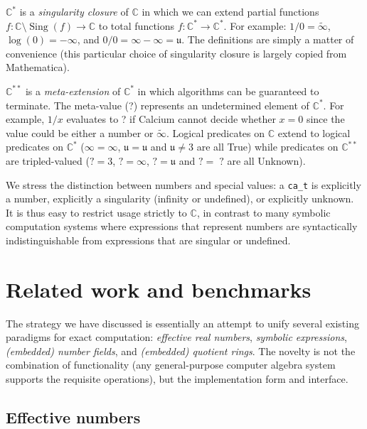 \documentclass[sigconf,screen,urlbreakonhyphens]{acmart}
\begin{document}
$\mathbb{C}^{*}$ is a \emph{singularity closure} of $\mathbb{C}$ in which
we can extend partial functions $f : \mathbb{C} \setminus \operatorname{Sing}(f) \rightarrow \mathbb{C}$ to
total functions $f : \mathbb{C}^{*} \rightarrow \mathbb{C}^{*}$.
For example: $1 / 0 = \tilde \infty$, $\log(0) = -\infty$, and $0 / 0 = \infty - \infty = \mathfrak{u}$.
The definitions are simply a matter of convenience
(this particular choice of singularity closure is largely copied from Mathematica).

$\mathbb{C}^{**}$ is a \emph{meta-extension} of $\mathbb{C}^{*}$
in which algorithms can be guaranteed to terminate.
The meta-value (?) represents an undetermined element of $\mathbb{C}^{*}$.
For example, $1 / x$ evaluates to ? if Calcium cannot decide whether $x = 0$
since the value could be either a number or $\tilde \infty$.
Logical predicates on $\mathbb{C}$ extend to logical predicates on $\mathbb{C}^{*}$
($\infty = \infty$, $\mathfrak{u} = \mathfrak{u}$ and $\mathfrak{u} \ne 3$ are all True)
while predicates on $\mathbb{C}^{**}$ are tripled-valued
($? = 3$, $? = \infty$, $? = \mathfrak{u}$ and $? =\;?$ are all Unknown).

We stress the distinction between numbers and special values:
a \texttt{ca\_t} is explicitly
a number, explicitly a singularity (infinity or undefined),
or explicitly unknown.
It is thus easy to restrict usage strictly to $\mathbb{C}$,
in contrast to many symbolic
computation systems where expressions that represent numbers
are syntactically indistinguishable from expressions that are
singular or undefined.

\section{Related work and benchmarks}

\label{sect:related}

The strategy we have discussed
is essentially an attempt to unify several existing
paradigms for exact computation: \emph{effective real numbers},
\emph{symbolic expressions}, \emph{(embedded) number fields},
and \emph{(embedded) quotient rings}. The novelty is not the combination
of functionality (any general-purpose
computer algebra system supports the requisite operations), but the implementation form and interface.

\subsection{Effective numbers}
\end{document}
